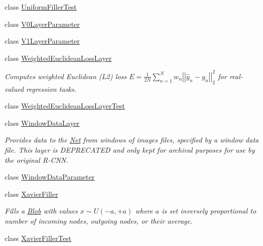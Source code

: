 \begin{DoxyCompactItemize}
class \mbox{\hyperlink{classcaffe_1_1_uniform_filler_test}{Uniform\+Filler\+Test}}
\item 
class \mbox{\hyperlink{classcaffe_1_1_v0_layer_parameter}{V0\+Layer\+Parameter}}
\item 
class \mbox{\hyperlink{classcaffe_1_1_v1_layer_parameter}{V1\+Layer\+Parameter}}
\item 
class \mbox{\hyperlink{classcaffe_1_1_weighted_euclidean_loss_layer}{Weighted\+Euclidean\+Loss\+Layer}}
\begin{DoxyCompactList}\small\item\em Computes weighted Euclidean (L2) loss $ E = \frac{1}{2N} \sum\limits_{n=1}^N w_n \left| \left| \hat{y}_n - y_n \right| \right|_2^2 $ for real-\/valued regression tasks. \end{DoxyCompactList}\item 
class \mbox{\hyperlink{classcaffe_1_1_weighted_euclidean_loss_layer_test}{Weighted\+Euclidean\+Loss\+Layer\+Test}}
\item 
class \mbox{\hyperlink{classcaffe_1_1_window_data_layer}{Window\+Data\+Layer}}
\begin{DoxyCompactList}\small\item\em Provides data to the \mbox{\hyperlink{classcaffe_1_1_net}{Net}} from windows of images files, specified by a window data file. This layer is {\itshape D\+E\+P\+R\+E\+C\+A\+T\+ED} and only kept for archival purposes for use by the original R-\/\+C\+NN. \end{DoxyCompactList}\item 
class \mbox{\hyperlink{classcaffe_1_1_window_data_parameter}{Window\+Data\+Parameter}}
\item 
class \mbox{\hyperlink{classcaffe_1_1_xavier_filler}{Xavier\+Filler}}
\begin{DoxyCompactList}\small\item\em Fills a \mbox{\hyperlink{classcaffe_1_1_blob}{Blob}} with values $ x \sim U(-a, +a) $ where $ a $ is set inversely proportional to number of incoming nodes, outgoing nodes, or their average. \end{DoxyCompactList}\item 
class \mbox{\hyperlink{classcaffe_1_1_xavier_filler_test}{Xavier\+Filler\+Test}}
\end{DoxyCompactItemize}
